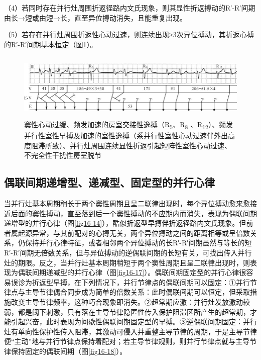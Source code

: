 （4）若同时存在并行灶周围折返径路内文氏现象，则其显性折返搏动的R′-R′间期由长→短或由短→长，直至异位搏动消失，且能重复出现。

（5）若存在并行灶周围折返性心动过速，则连续出现≥3次异位搏动，其折返心搏的R′-R′间期基本恒定（图\ref{fig16-16}）。

\begin{figure}[!htbp]
 \centering
 \includegraphics[width=5.73958in,height=1.26042in]{./images/Image00292.jpg}
 \captionsetup{justification=centering}
 \caption{窦性心动过缓、频发加速的房室交接性逸搏（R\textsubscript{5}、R\textsubscript{8} 、R\textsubscript{12}）、频发并行性室性早搏及加速的室性逸搏（系并行性室性心动过速伴外出高度阻滞所致）、并行灶周围连续显性折返引起短阵性室性心动过速、不完全性干扰性房室脱节}
 \label{fig16-16}
  \end{figure} 


\protect\hypertarget{text00023.htmlux5cux23subid292}{}{}

\subsection{偶联间期递增型、递减型、固定型的并行心律}

当并行灶基本周期稍长于两个窦性周期且呈二联律出现时，每个异位搏动愈来愈接近后面的窦性搏动，直至落到后一个窦性搏动的不应期内而消失，表现为偶联间期递增型的并行心律（图\ref{fig16-14}），酷似折返型早搏伴折返径路内文氏现象。但前者属起源异常，与其前配对的心搏无关，两个异位搏动之间的距离相等或呈倍数关系，仍保持并行心律特征，或者相邻两个异位搏动的长R′-R′间期虽然与等长的短R′-R′间期无倍数关系，但与异位搏动的逆偶联间期的长短有关，可找出传入并行灶的期限。反之，当并行灶基本周期稍短于两个窦性周期且呈二联律出现时，则表现为偶联间期递减型的并行心律（图\ref{fig16-17}）。偶联间期固定型的并行心律很容易误诊为折返型早搏，在下列情况下，并行节律点的偶联间期可以固定：①并行节律点与主导节律偶合同步成为简单的倍数关系：此时偶联间期可以恒定，但采取措施改变主导节律频率，这种巧合现象即消失。②超常期应激：并行灶发放激动较弱，都是阈下刺激，只有落在主导节律隐匿性传入保护阻滞区所产生的超常期，才能引起兴奋，此时表现为间歇性偶联间期固定型的早搏。③逆偶联间期固定：并行灶有单向性保护性传入阻滞，其激动可侵入并重整主导节律的周期，于是主导节律便“主动”地与并行节律点保持着配对；若主导节律规则，则并行节律点就与主导节律保持固定的偶联间期（图\ref{fig16-18}）。

